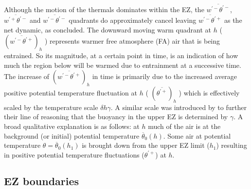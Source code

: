 Although the motion of the thermals dominates within the EZ, the $\overline{w^{'-}\theta^{'-}}$, $\overline{w^{'+}\theta^{'-}}$ and $\overline{w^{'-}\theta^{'-}}$ quadrants do approximately cancel leaving $\overline{w^{'-}\theta^{'+}}$ as the net dynamic, as \cite{SullMoengStev} concluded. The downward moving warm quadrant at $h$ ( $(\overline{w^{'-}\theta^{'+}})_{h}$ ) represents warmer free atmosphere (FA) air that is being entrained.  So its magnitude, at a certain point in time, is an indication of how much the region below will be warmed due to entrainment at a successive time.  The increase of $(\overline{w^{'-}\theta^{'+}})_{h}$ in time is primarily due to the increased average positive potential temperature fluctuation at $h$ ( $(\overline{\theta^{'+}})_{h}$ ) which is effectively scaled by the temperature scale $\delta h \gamma$.  A similar scale was introduced by \cite{GarciaMellado} to further their line of reasoning that the buoyancy in the upper EZ is determined by $\gamma$. A broad qualitative explanation is as follows: at $h$ much of the air is at the background (or initial) potential temperature $\overline{\theta}_{0}(h)$.  Some air at potential temperature $\theta = \overline{\theta}_{0}(h_{1})$ is brought down from the upper EZ limit ($h_{1}$) resulting in positive potential temperature fluctuations ($\theta^{'+}$) at $h$.\\

\subsection{EZ boundaries}

